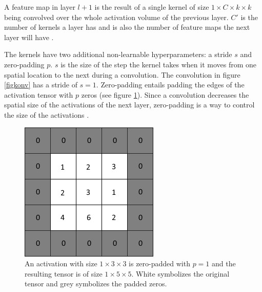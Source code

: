 \documentclass[a4paper, twoside]{article}
\begin{document}
A feature map in layer $l+1$ is the result of a single kernel of size $1 \times C  \times k\times k$ being convolved over the whole activation volume of the previous layer. $C'$ is the number of kernels a layer has and is also the number of feature maps the next layer will have \cite{cs231n} \cite{convmath}. 

The kernels have two additional non-learnable hyperparameters: a stride $s$ and zero-padding $p$. $s$ is the size of the step the kernel takes when it moves from one spatial location to the next during a convolution. The convolution in figure \ref{figkonv} has a stride of $s = 1$. Zero-padding entails padding the edges of the activation tensor with $p$ zeros (see figure \ref{figzeropad}). Since a convolution decreases the spatial size of the activations of the next layer, zero-padding is a way to control the size of the activations \cite{cs231n} \cite{convmath} \cite{convarithmetic}. 

\begin{figure}[h]
	\centering
  		\includegraphics[scale=0.7]{zeropadding.png}
  	\caption{An activation with size $1 \times 3 \times 3$ is zero-padded with $p=1$ and the resulting tensor is of size $1 \times 5 \times 5$. White symbolizes the original tensor and grey symbolizes the padded zeros. } \label{figzeropad}
\end{figure}
\end{document}
